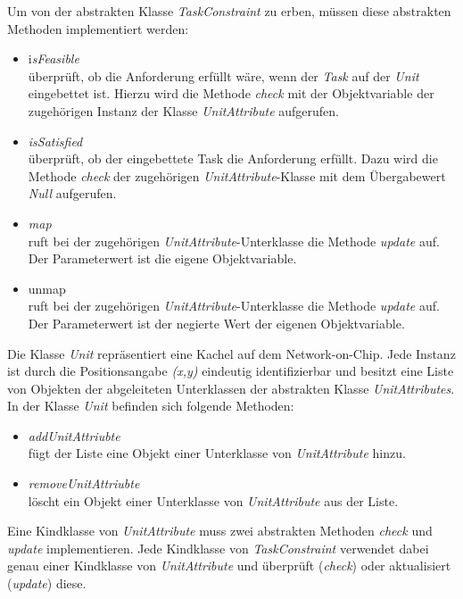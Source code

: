 Um von der abstrakten Klasse \textit{TaskConstraint} zu erben, müssen diese abstrakten Methoden implementiert werden:\\
\begin{itemize}
\item i\textit{sFeasible}\\
überprüft, ob die Anforderung erfüllt wäre, wenn der \textit{Task} auf der \textit{Unit} eingebettet ist. Hierzu wird die Methode \textit{check} mit der Objektvariable der zugehörigen Instanz der Klasse \textit{UnitAttribute} aufgerufen.
\item \textit{isSatisfied}\\
überprüft, ob der eingebettete Task die Anforderung erfüllt. Dazu wird die Methode \textit{check} der zugehörigen \textit{UnitAttribute}-Klasse mit dem Übergabewert \textit{Null} aufgerufen. 
\item \textit{map} \\
ruft bei der zugehörigen \textit{UnitAttribute}-Unterklasse die Methode \textit{update} auf. Der Parameterwert ist die eigene Objektvariable.
\item \textit{}unmap\\
ruft bei der zugehörigen \textit{UnitAttribute}-Unterklasse die Methode \textit{update} auf. Der Parameterwert ist der negierte Wert der eigenen Objektvariable.
\end{itemize}

Die Klasse \textit{Unit} repräsentiert eine Kachel auf dem Network-on-Chip. Jede Instanz ist durch die Positionsangabe \textit{(x,y)} eindeutig identifizierbar und besitzt eine Liste von Objekten der abgeleiteten Unterklassen der abstrakten Klasse \textit{UnitAttributes}. In der Klasse \textit{Unit} befinden sich folgende Methoden:
\begin{itemize}
\item \textit{addUnitAttriubte}\\
fügt der Liste eine Objekt einer Unterklasse von \textit{UnitAttribute} hinzu.
\item \textit{removeUnitAttriubte}\\
löscht ein Objekt einer Unterklasse von \textit{UnitAttribute} aus der Liste.
\end{itemize}

Eine Kindklasse von \textit{UnitAttribute} muss zwei abstrakten Methoden \textit{check} und \textit{update} implementieren. Jede Kindklasse von \textit{TaskConstraint} verwendet dabei genau einer Kindklasse von \textit{UnitAttribute} und überprüft (\textit{check}) oder aktualisiert (\textit{update}) diese.

